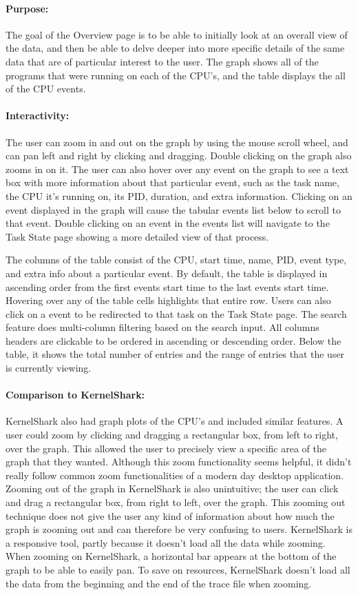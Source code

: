 \documentclass{hmcclinic}
\begin{document}
\paragraph{Purpose:} 
The goal of the Overview page is to be able to initially look at an overall view
of the data, and then be able to delve deeper into more specific details of the
same data that are of particular interest to the user. The graph shows all of 
the programs that were running on each of the CPU's, and the table displays 
the all of the CPU events.

\paragraph{Interactivity:} The user can zoom in and out on the graph by using the mouse scroll wheel, and can pan left and right by clicking and dragging. Double clicking on the graph also zooms in on it. The user can also hover over any event on the graph to see a text box with more information about that particular event, such as the task name, the CPU it's running on, its PID, duration, and extra information. Clicking on an event displayed in the graph will cause the tabular events list below to scroll to that event. Double clicking on an event in the events list will navigate to the Task State page showing a more detailed view of that process.

The columns of the table consist of the CPU, start time, name, PID, event type, and extra info about a particular event. By default, the table is displayed in ascending order from the first events start time to the last events start time. Hovering over any of the table cells highlights that entire row. Users can also click on a event to be redirected to that task on the Task State page. The search feature does multi-column filtering based on the search input. All columns headers are clickable to be ordered in ascending or descending order. Below the table, it shows the total number of entries and the range of entries that the user is currently viewing.

\paragraph{Comparison to KernelShark:} KernelShark also had graph plots of the CPU's and included similar features. A user could zoom by clicking and dragging a rectangular box, from left to right, over the graph. This allowed the user to precisely view a specific area of the graph that they wanted. Although this zoom functionality seems helpful, it didn't really follow common zoom functionalities of a modern day desktop application. Zooming out of the graph in KernelShark is also unintuitive; the user can click and drag a rectangular box, from right to left, over the graph. This zooming out technique does not give the user any kind of information about how much the graph is zooming out and can therefore be very confusing to users. KernelShark is a responsive tool, partly because it doesn't load all the data while zooming. When zooming on KernelShark, a horizontal bar appears at the bottom of the graph to be able to easily pan. To save on resources, KernelShark doesn't load all the data from the beginning and the end of the trace file when zooming. 
    
\end{document}
